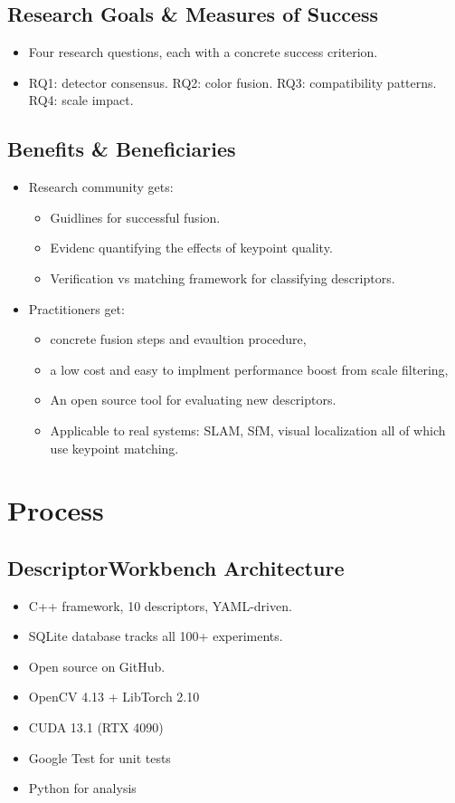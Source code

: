 \documentclass[11pt, letterpaper]{article}
\begin{document}
\subsection{Research Goals \& Measures of Success}
\begin{itemize}
  \item Four research questions, each with a concrete success criterion.
  \item RQ1: detector consensus. RQ2: color fusion. RQ3: compatibility patterns. RQ4: scale impact.
\end{itemize}

\newpage

\subsection{Benefits \& Beneficiaries}
\begin{itemize}
  \item Research community gets: 
  \begin{itemize}
  \item Guidlines for successful fusion.
  \item Evidenc quantifying the effects of keypoint quality.
  \item Verification vs matching framework for classifying descriptors.
  \end{itemize}
  \item Practitioners get: 
  \begin{itemize}
  \item concrete fusion steps and evaultion procedure,
  \item a low cost and easy to implment performance boost from scale filtering, 
  \item An open source tool for evaluating new descriptors.
  \item Applicable to real systems: SLAM, SfM, visual localization all of which use keypoint matching.
  \end{itemize}
\end{itemize}

\newpage
\section{Process}

\subsection{DescriptorWorkbench Architecture}
\begin{itemize}
  \item C++ framework, 10 descriptors, YAML-driven.
  \item SQLite database tracks all 100+ experiments.
  \item Open source on GitHub.
  \item OpenCV 4.13 + LibTorch 2.10
  \item CUDA 13.1 (RTX 4090)
  \item  Google Test for unit tests
  \item Python for analysis
\end{itemize}
\end{document}
